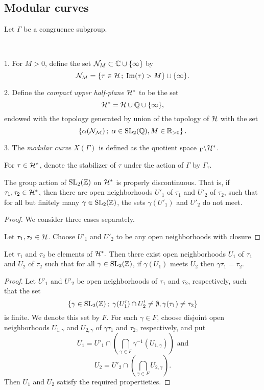 \subsection{Modular curves}

Let $\Gamma$ be a congruence subgroup.

\begin{defi} \ 

  1. For $M>0$, define the set $\mathcal{N}_M \subset \mathbb{C}\cup\{\infty\}$ by
  \[\mathcal{N}_M=\left\{\tau\in\mathcal{H}\,;\; \operatorname{Im}(\tau)>M\right\}\cup\{\infty\}.\]

  2. Define the \emph{compact upper half-plane} $\mathcal{H}^*$ to be the set
  \[\mathcal{H}^*=\mathcal{H}\cup\mathbb{Q}\cup\{\infty\},\]
  endowed with the topology generated by union of the topology of $\mathcal{H}$ with the set
  \[\left\{\alpha(\mathcal{N_M})\,;\; \alpha\in\operatorname{SL}_2(\mathbb{Q}), M\in\mathbb{R}_{>0}\right\}.\]
  
  3. The \emph{modular curve} $X(\Gamma)$ is defined as the quotient space $_\Gamma\backslash\mathcal{H}^*$.
\end{defi}

For $\tau\in\mathcal{H}^*$, denote the stabilizer of $\tau$ under the action of $\Gamma$ by $\Gamma_\tau$.

\begin{prop}
 The group action of $\operatorname{SL}_2(\mathbb{Z})$ on $\mathcal{H}^*$ is properly discontinuous. That is, if $\tau_1, \tau_2\in\mathcal{H}^*$, then there are open neighborhoods $U'_1$ of $\tau_1$ and $U'_2$ of $\tau_2$, such that for all but finitely many $\gamma\in\operatorname{SL}_2(\mathbb{Z})$, the sets $\gamma(U'_1)$ and $U'_2$ do not meet.
\end{prop}

\begin{proof}
 We consider three cases separately.
 
  Let $\tau_1,\tau_2\in\mathcal{H}$. Choose $U'_1$ and $U'_2$ to be any open neighborhoods with closure
 
 
\end{proof}

\begin{cor}
 Let $\tau_1$ and $\tau_2$ be elements of $\mathcal{H}^*.$ Then there exist open neighborhoods $U_1$ of $\tau_1$ and $U_2$ of $\tau_2$ such that for all $\gamma\in\operatorname{SL}_2(\mathbb{Z})$, if $\gamma(U_1)$ meets $U_2$ then $\gamma\tau_1 = \tau_2$.
\end{cor}

\begin{proof}
 Let $U'_1$ and $U'_2$ be open neighborhoods of $\tau_1$ and $\tau_2$, respectively, such that the set
 \[\{\gamma\in\operatorname{SL}_2(\mathbb{Z})\,;\; \gamma(U'_1)\cap U'_2\neq\emptyset, \gamma(\tau_1)\neq \tau_2\}\]
 is finite. We denote this set by $F$. For each $\gamma\in F$, choose disjoint open neighborhoods $U_{1,\gamma}$ and $U_{2,\gamma}$ of $\gamma\tau_1$ and $\tau_2$, respectively, and put
 \[U_1 = U'_1\cap\left(\bigcap_{\gamma\in F}\gamma^{-1}(U_{1,\gamma})\right)\text{ and}\]
 \[U_2 = U'_2\cap\left(\bigcap_{\gamma\in F}U_{2,\gamma}\right).\]
 Then $U_1$ and $U_2$ satisfy the required propertieties.
\end{proof}


